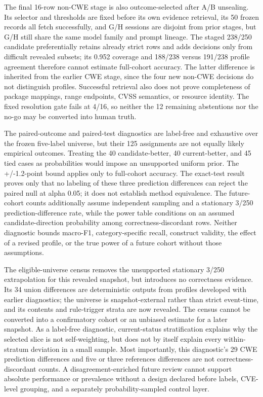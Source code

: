The final 16-row non-CWE stage is also outcome-selected after A/B unsealing. Its selector and thresholds are fixed before its own evidence retrieval, its 50 frozen records all fetch successfully, and G/H sessions are disjoint from prior stages, but G/H still share the same model family and prompt lineage. The staged 238/250 candidate preferentially retains already strict rows and adds decisions only from difficult revealed subsets; its 0.952 coverage and 188/238 versus 191/238 profile agreement therefore cannot estimate full-cohort accuracy. The latter difference is inherited from the earlier CWE stage, since the four new non-CWE decisions do not distinguish profiles. Successful retrieval also does not prove completeness of package mappings, range endpoints, CVSS semantics, or resource identity. The fixed resolution gate fails at 4/16, so neither the 12 remaining abstentions nor the no-go may be converted into human truth.

The paired-outcome and paired-test diagnostics are label-free and exhaustive over the frozen five-label universe, but their 125 assignments are not equally likely empirical outcomes. Treating the 40 candidate-better, 40 current-better, and 45 tied cases as probabilities would impose an unsupported uniform prior. The +/-1.2-point bound applies only to full-cohort accuracy. The exact-test result proves only that no labeling of these three prediction differences can reject the paired null at alpha 0.05; it does not establish method equivalence. The future-cohort counts additionally assume independent sampling and a stationary 3/250 prediction-difference rate, while the power table conditions on an assumed candidate-direction probability among correctness-discordant rows. Neither diagnostic bounds macro-F1, category-specific recall, construct validity, the effect of a revised profile, or the true power of a future cohort without those assumptions.

The eligible-universe census removes the unsupported stationary 3/250 extrapolation for this revealed snapshot, but introduces no correctness evidence. Its 34 union differences are deterministic outputs from profiles developed with earlier diagnostics; the universe is snapshot-external rather than strict event-time, and its contents and rule-trigger strata are now revealed. The census cannot be converted into a confirmatory cohort or an unbiased estimate for a later snapshot. As a label-free diagnostic, current-status stratification explains why the selected slice is not self-weighting, but does not by itself explain every within-stratum deviation in a small sample. Most importantly, this diagnostic's 29 CWE prediction differences and five or three references differences are not correctness-discordant counts. A disagreement-enriched future review cannot support absolute performance or prevalence without a design declared before labels, CVE-level grouping, and a separately probability-sampled control layer.

